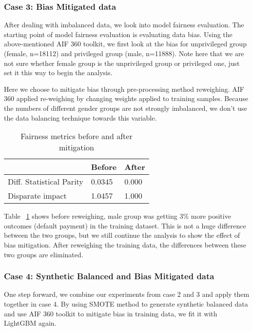 \documentclass{article}
\begin{document}
\subsubsection{Case 3: Bias Mitigated data}
After dealing with imbalanced data, we look into model fairness evaluation. The starting point of model fairness evaluation is evaluating data bias. Using the above-mentioned AIF 360 toolkit, we first look at the bias for unprivileged group (female, n=18112) and privileged group (male, n=11888). Note here that we are not sure whether female group is the unprivileged group or privileged one, just set it this way to begin the analysis. 

Here we choose to mitigate bias through pre-processing method reweighing. AIF 360 applied re-weighing by changing weights applied to training samples. Because the numbers of different gender groups are not strongly imbalanced, we don't use the data balancing technique towards this variable. 

\begin{table}[]
 \caption{Fairness metrics before and after mitigation}
  \label{table4}
  \centering
\begin{tabular}{|l|l|l|}
\hline
                         & Before & After \\ \hline
Diff. Statistical Parity & 0.0345 & 0.000 \\ \hline
Disparate impact         & 1.0457 & 1.000 \\ \hline
\end{tabular}
\end{table}
Table ~\ref{table4} shows before reweighing, male group was getting 3\% more positive outcomes (default payment) in the training dataset. This is not a huge difference between the two groups, but we still continue the analysis to show the effect of bias mitigation. After reweighing the training data, the differences between these two groups are eliminated.

\subsubsection{Case 4: Synthetic Balanced and Bias Mitigated data}

One step forward, we combine our experiments from case 2 and 3 and apply them together in case 4. By using SMOTE method to generate synthetic balanced data and use AIF 360 toolkit to mitigate bias in training data, we fit it with LightGBM again. 
\end{document}
